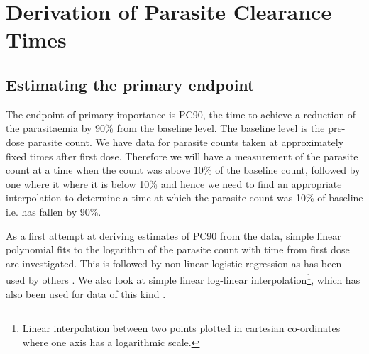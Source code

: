\chapter{Derivation of Parasite Clearance Times}\label{ch:derivation}
\section{Estimating the primary endpoint}
The endpoint of primary importance is PC90, the time to achieve a reduction of the parasitaemia by 90\% from the baseline level. The baseline level is the pre-dose parasite count. We have data for parasite counts taken at approximately fixed times after first dose. Therefore we will have a measurement of the parasite count at a time when the count was above 10\% of the baseline count, followed by one where it where it is below 10\% and hence we need to find an appropriate interpolation to determine a time at which the parasite count was 10\% of baseline i.e. has fallen by 90\%.

As a first attempt at deriving estimates of PC90 from the data, simple linear polynomial fits to the logarithm of the parasite count with time from first dose are investigated. This is followed by non-linear logistic regression as has been used by others \cite{wootton}. We also look at simple linear log-linear interpolation\footnote{Linear interpolation between two points plotted in cartesian co-ordinates where one axis has a logarithmic scale.}, which has also been used for data of this kind \cite{carmello}.
